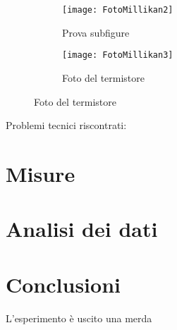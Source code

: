 \documentclass{article}
\begin{document}
\begin{figure}[h]
  \centering
  \begin{subfigure}[b]{0.4\linewidth}
    \texttt{[image: FotoMillikan2]}
    \caption{Prova subfigure}
  \end{subfigure}
  \begin{subfigure}[b]{0.4\linewidth}
    \texttt{[image: FotoMillikan3]}
    \caption{Foto del termistore}
  \end{subfigure}
\end{figure}

Problemi tecnici riscontrati: 

\section{Misure}

\section{Analisi dei dati}

\section{Conclusioni}
L'esperimento è uscito una merda

\section{}
\end{document}
